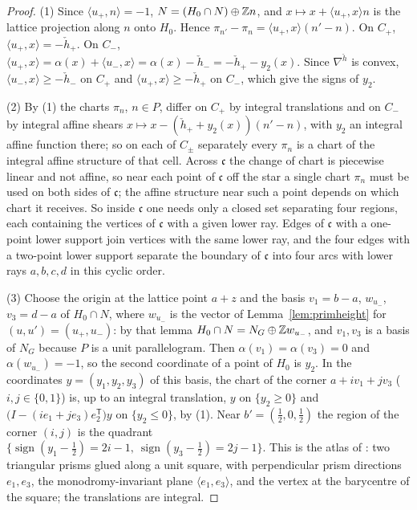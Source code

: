 \begin{proof}
(1) Since $\langle u_+,n\rangle=-1$, $N=(H_0\cap N)\oplus\mathbb Z n$, and $x\mapsto x+\langle u_+,x\rangle n$ is the lattice projection
along $n$ onto $H_0$. Hence $\pi_{n'}-\pi_n=\langle u_+,x\rangle(n'-n)$. On $C_+$, $\langle u_+,x\rangle=-\check h_+$. On $C_-$,
$\langle u_+,x\rangle=\alpha(x)+\langle u_-,x\rangle=\alpha(x)-\check h_-=-\check h_+-y_2(x)$. Since $\nabla^{\check h}$ is convex,
$\langle u_-,x\rangle\ge-\check h_-$ on $C_+$ and $\langle u_+,x\rangle\ge-\check h_+$ on $C_-$, which give the signs of $y_2$.

(2) By (1) the charts $\pi_n$, $n\in P$, differ on $C_+$ by integral translations and on $C_-$ by integral affine shears
$x\mapsto x-(\check h_++y_2(x))(n'-n)$, with $y_2$ an integral affine function there; so on each of $C_\pm$ separately every
$\pi_n$ is a chart of the integral affine structure of that cell. Across $\mathfrak c$ the change of chart is piecewise
linear and not affine, so near each point of $\mathfrak c$ off the star a single chart $\pi_n$ must be used on both sides of
$\mathfrak c$; the affine structure near such a point depends on which chart it receives. So inside
$\mathfrak c$ one needs only a closed set separating four regions, each containing the
vertices of $\mathfrak c$ with a given lower ray. Edges of $\mathfrak c$ with a one-point lower support join vertices with the same
lower ray, and the four edges with a two-point lower support separate the boundary of $\mathfrak c$ into four arcs with lower rays
$a,b,c,d$ in this cyclic order.

(3) Choose the origin at the lattice point $a+z$ and the basis $v_1=b-a$, $w_{u_-}$, $v_3=d-a$ of $H_0\cap N$, where $w_{u_-}$ is the
vector of Lemma~\ref{lem:primheight} for $(u,u')=(u_+,u_-)$: by that lemma $H_0\cap N=N_G\oplus\mathbb Z w_{u_-}$, and $v_1,v_3$ is a basis of
$N_G$ because $P$ is a unit parallelogram. Then $\alpha(v_1)=\alpha(v_3)=0$ and $\alpha(w_{u_-})=-1$, so the second coordinate of a point of $H_0$ is
$y_2$. In the coordinates $y=(y_1,y_2,y_3)$ of this basis, the chart of
the corner $a+iv_1+jv_3$ ($i,j\in\{0,1\}$) is, up to an integral translation, $y$ on $\{y_2\ge0\}$ and
$\bigl(I-(ie_1+je_3)e_2^{\mathsf T}\bigr)y$ on $\{y_2\le0\}$, by (1). Near $b'=(\tfrac12,0,\tfrac12)$ the region of the corner
$(i,j)$ is the quadrant $\{\operatorname{sign}(y_1-\tfrac12)=2i-1,\ \operatorname{sign}(y_3-\tfrac12)=2j-1\}$. This is the
atlas of \cite[Ex.~6.1]{CBM}: two triangular prisms glued along a unit square, with perpendicular prism directions $e_1,e_3$, the
monodromy-invariant plane $\langle e_1,e_3\rangle$, and the vertex at the barycentre of the square; the translations are
integral.
\end{proof}

